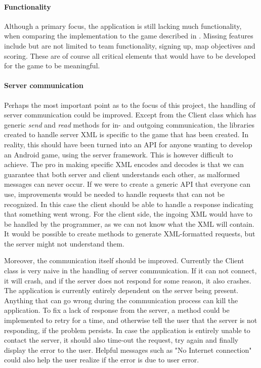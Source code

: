 \paragraph{Functionality}
Although a primary focus, the application is still lacking much functionality, when comparing the implementation to the game described in . Missing features include but are not limited to team functionality, signing up, map objectives and scoring. These are of course all critical elements that would have to be developed for the game to be meaningful.

\paragraph{Server communication}
Perhaps the most important point as to the focus of this project, the handling of server communication could be improved. Except from the Client class which has generic \textit{send} and \textit{read} methods for in- and outgoing communication, the libraries created to handle server XML is specific to the game that has been created. In reality, this should have been turned into an API for anyone wanting to develop an Android game, using the server framework. This is however difficult to achieve. The pro in making specific XML encodes and decodes is that we can guarantee that both server and client understands each other, as malformed messages can never occur. If we were to create a generic API that everyone can use, improvements would be needed to handle requests that can not be recognized. In this case the client should be able to handle a response indicating that something went wrong. For the client side, the ingoing XML would have to be handled by the programmer, as we can not know what the XML will contain. It would be possible to create methods to generate XML-formatted requests, but the server might not understand them.

Moreover, the communication itself should be improved. Currently the Client class is very naive in the handling of server communication. If it can not connect, it will crash, and if the server does not respond for some reason, it also crashes. The application is currently entirely dependent on the server being present. Anything that can go wrong during the communication process can kill the application. To fix a lack of response from the server, a method could be implemented to retry for a time, and otherwise tell the user that the server is not responding, if the problem persists. In case the application is entirely unable to contact the server, it should also time-out the request, try again and finally display the error to the user. Helpful messages such as "No Internet connection" could also help the user realize if the error is due to user error.
